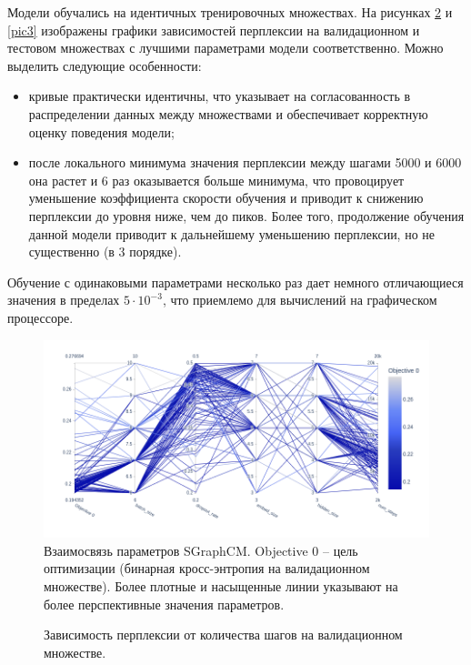 \documentclass[diploma]{nanolab2015}
\begin{document}
Модели обучались на идентичных тренировочных множествах. На рисунках \ref{pic2} и \ref{pic3} изображены графики зависимостей перплексии на валидационном и тестовом множествах с лучшими параметрами модели соответственно. Можно выделить следующие особенности:
\begin{itemize}
    \item кривые практически идентичны, что указывает на согласованность в распределении данных между множествами и обеспечивает корректную оценку поведения модели;
    \item после локального минимума значения перплексии между шагами 5000 и 6000 она растет и 6 раз оказывается больше минимума, что провоцирует уменьшение коэффициента скорости обучения и приводит к снижению перплексии до уровня ниже, чем до пиков. Более того, продолжение обучения данной модели приводит к дальнейшему уменьшению перплексии, но не существенно (в 3 порядке).
\end{itemize}

Обучение с одинаковыми параметрами несколько раз дает немного отличающиеся значения в пределах $5 \cdot 10^{-3}$, что приемлемо для вычислений на графическом процессоре.

\begin{figure}[ht]
    \centering
    \includegraphics[scale=0.55]{./assets/optuna-params.png}
    \caption{Взаимосвязь параметров SGraphCM. Objective 0 -- цель оптимизации (бинарная кросс-энтропия на валидационном множестве). Более плотные и насыщенные линии указывают на более перспективные значения параметров.}
    \label{pic1}
\end{figure}

\newpage

\begin{figure}[ht]
    \centering
    
    \caption{Зависимость перплексии от количества шагов на валидационном множестве.}
    \label{pic2}
\end{figure}
\end{document}
